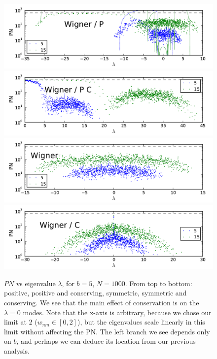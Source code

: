\documentclass[onecolumn,fleqn,longbibliography]{revtex4}
\begin{document}
\begin{figure}[H]
    \includegraphics{pta_box2_positive}\\
    \includegraphics{pta_box2_pos_cons}\\
    \includegraphics{pta_box2_symmetric}\\
    \includegraphics{pta_box2_sym_cons}
    \caption{$PN$ vs eigenvalue $\lambda$, for $b=5$, $N=1000$. From top to bottom:
    positive, positive and conserving, symmetric, symmetric and conserving. We see
    that the main effect of conservation is on the $\lambda=0$ modes. Note 
    that the x-axis is arbitrary, because we chose our limit at $2$ ($w_{nm} \in [0,2]$), but the 
    eigenvalues scale linearly in this limit without affecting the PN.
    The left branch we see depends only on $b$, and perhaps we can deduce its location
    from our previous analysis.}
    \label{fig:BB}
\end{figure}
\end{document}
